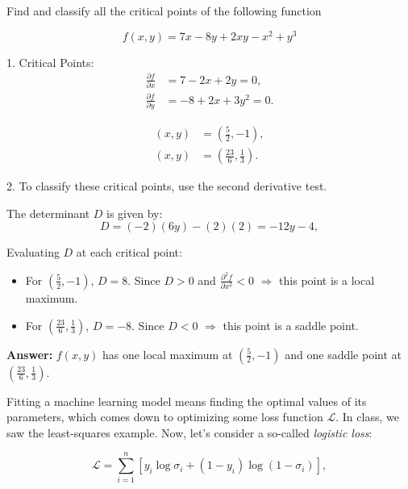 \documentclass{exam}
\begin{document}
\begin{questions}

\question[4]

Find and classify all the critical points of the following function

$$f(x,y) = 7x - 8y + 2xy - x^2 + y^3$$


\begin{solution}

1. Critical Points:
\begin{align*}
\frac{\partial f}{\partial x} &= 7 - 2x + 2y = 0, \\
\frac{\partial f}{\partial y} &= -8 + 2x + 3y^2 = 0.
\end{align*}

\begin{align*}
(x, y) &= \left(\frac{5}{2}, -1\right), \\
(x, y) &= \left(\frac{23}{6}, \frac{1}{3}\right).
\end{align*}

2. To classify these critical points, use the second derivative test. 

The determinant $ D $ is given by:
$$ D = (-2)(6y) - (2)(2) = -12y - 4, $$

Evaluating $ D $ at each critical point:

\begin{itemize}
\item For $ \left(\frac{5}{2}, -1\right) $, $ D = 8 $. Since $ D > 0 $ and $ \frac{\partial^2 f}{\partial x^2} < 0 $ $\Rightarrow$ this point is a local maximum.
\item For $ \left(\frac{23}{6}, \frac{1}{3}\right) $, $ D = -8 $. Since $ D < 0 $ $\Rightarrow$ this point is a saddle point.
\end{itemize}

\textbf{Answer:} $ f(x,y) $ has one local maximum at $ \left(\frac{5}{2}, -1\right) $ and one saddle point at $ \left(\frac{23}{6}, \frac{1}{3}\right) $.

\end{solution}

\question[6]

Fitting a machine learning model means finding the optimal values of its parameters, which comes down to optimizing some loss function $\mathcal{L}$. In class, we saw the least-squares example. Now, let’s consider a so-called \textit{logistic loss}:

$$\mathcal{L} = \sum_{i=1}^{n} \left[ y_i \log{\sigma_i} + (1-y_i)\log{\left(1 - \sigma_i \right)} \right],$$


\end{questions}
\end{document}

